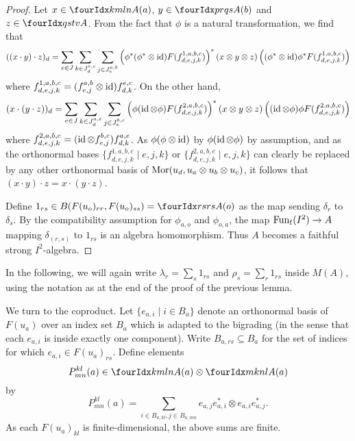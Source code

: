\begin{proof} Let $x\in \Gr{A}{k}{l}{m}{n}(a)$, $y\in \Gr{A}{p}{q}{r}{s}(b)$ and $z\in \Gr{A}{q}{t}{s}{v}$. From the fact that $\phi$ is a natural transformation, we find that \[((x\cdot y)\cdot z)_d = \sum_{e\in J}\sum_{k\in J_d^{e,c}}\sum_{j\in J_e^{a,b}} \left(\phi^*(\phi^*\otimes \operatorname{id})F(f_{d,e,j,k}^{1,a,b,c})\right)^*(x\otimes y\otimes z)\left((\phi^*\otimes \operatorname{id})\phi^* F(f_{d,e,j,k}^{1,a,b,c})\right)\] where $f_{d,e,j,k}^{1,a,b,c}=(f_{e,j}^{a,b}\otimes \operatorname{id})f_{d,k}^{e,c}$. On the other hand, \[(x\cdot (y\cdot z))_d = \sum_{e\in J}\sum_{k\in J_d^{a,e}}\sum_{j\in J_e^{b,c}} \left(\phi(\operatorname{id}\otimes \phi)F(f_{d,e,j,k}^{2,a,b,c})\right)^*(x\otimes y\otimes z)\left((\operatorname{id}\otimes \phi)\phi F(f_{d,e,j,k}^{2,a,b,c})\right)\] where $f_{d,e,j,k}^{2,a,b,c} = (\operatorname{id}\otimes f_{e,j}^{b,c})f_{d,k}^{a,e}$. As $\phi(\phi\otimes \operatorname{id})$ by $\phi(\operatorname{id}\otimes \phi)$ by assumption, and as the orthonormal bases $\{f_{d,e,j,k}^{1,a,b,c}\mid e,j,k\}$ or $\{f^{2,a,b,c}_{d,e,j,k}\mid e,j,k\}$ can clearly be replaced by any other orthonormal basis of $\mathrm{Mor}(u_d,u_a\otimes u_b\otimes u_c)$, it follows that $(x\cdot y)\cdot z = x\cdot (y\cdot z)$.

Define $1_{rs} \in B(F(u_o)_{rr},F(u_o)_{ss}) = \Gr{A}{r}{r}{s}{s}(o)$ as the map sending $\delta_r$ to $\delta_s$. By the compatibility assumption for $\phi_{a,o}$ and $\phi_{o,a}$, the map $\mathrm{Fun}_{\operatorname{\mathrm{f}}}(I^2)\rightarrow A$ mapping $\delta_{(r,s)}$ to $1_{rs}$ is an algebra homomorphism. Thus $A$ becomes a faithful strong $I^2$-algebra.
\end{proof}

In the following, we will again write $\lambda_r = \sum_s 1_{rs}$ and $\rho_s = \sum_r 1_{rs}$ inside $M(A)$, using the notation as at the end of the proof of the previous lemma.

We turn to the coproduct. Let $\{e_{a,i}\mid i\in B_a\}$ denote an orthonormal basis of $F(u_a)$ over an index set $B_a$ which is adapted to the bigrading (in the sense that each $e_{a,i}$ is inside exactly one component). Write $B_{a,rs}\subseteq B_a$ for the set of indices for which $e_{a,i}\in F(u_a)_{rs}$. Define elements \[P^{kl}_{mn}(a)\in \Gr{A}{k}{l}{m}{n}(a) \otimes \Gr{A}{m}{n}{k}{l}(a)\] by \[P^{kl}_{mn}(a) = \sum_{i\in B_{a,kl},j\in B_{a,mn}}  e_{a,j}e_{a,i}^*\otimes e_{a,i}e_{a,j}^*.\] As each $F(u_a)_{kl}$ is finite-dimensional, the above sums are finite.


